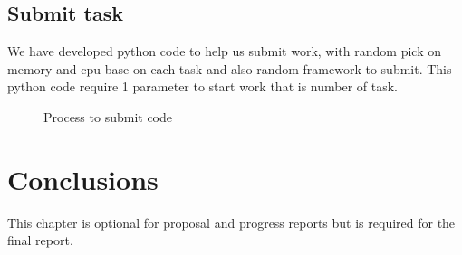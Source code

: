 \documentclass[12pt,oneside,openright,a4paper]{cpe-english-project}
\begin{document}
\section{Submit task}
     We have developed python code to help us submit work, with random pick on memory and cpu base on each task and also random framework to submit. This python code require 1 parameter to start work that is number of task.
	\begin{figure}[!h]\centering
    \setlength{\fboxrule}{0mm} %
    \setlength{\fboxsep}{0cm}
    \caption{Process to submit code}\label{fig:submit}
    \end{figure}

\chapter{Conclusions}

This chapter is optional for proposal and progress reports but 
is required for the final report.
\end{document}
